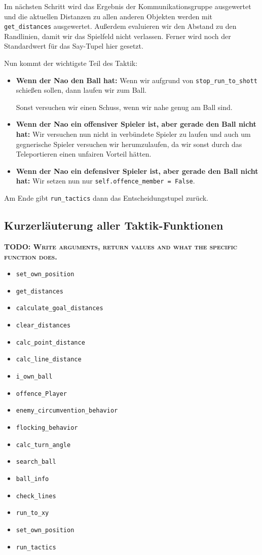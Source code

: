 Im nächsten Schritt wird das Ergebnis der Kommunikationsgruppe ausgewertet und die aktuellen Distanzen zu allen anderen Objekten werden mit \texttt{get\_distances} ausgewertet. Außerdem evaluieren wir den Abstand zu den Randlinien, damit wir das Spielfeld nicht verlassen. Ferner wird noch der Standardwert für das Say-Tupel hier gesetzt. 

Nun kommt der wichtigste Teil des Taktik:

\begin{itemize}
\item \textbf{Wenn der Nao den Ball hat: }
Wenn wir aufgrund von \texttt{stop\_run\_to\_shott} schießen sollen, dann laufen wir zum Ball.

Sonst versuchen wir einen Schuss, wenn wir nahe genug am Ball sind.
\item \textbf{Wenn der Nao ein offensiver Spieler ist, aber gerade den Ball nicht hat: }
Wir versuchen nun nicht in verbündete Spieler zu laufen und auch um gegnerische Spieler versuchen wir herumzulaufen, da wir sonst durch das Teleportieren einen unfairen Vorteil hätten. 
\item \textbf{Wenn der Nao ein defensiver Spieler ist, aber gerade den Ball nicht hat: }
Wir setzen nun nur \texttt{self.offence\_member = False}.
\end{itemize}

Am Ende gibt \texttt{run\_tactics} dann das \glqq Entscheidungstupel \grqq zurück.

\subsection{Kurzerläuterung aller Taktik-Funktionen}
\textbf{\textsc{TODO: Write arguments, return values and what the specific function does.}}
\begin{itemize}
\item \texttt{set\_own\_position}
\item \texttt{get\_distances}
\item \texttt{calculate\_goal\_distances}
\item \texttt{clear\_distances}
\item \texttt{calc\_point\_distance}
\item \texttt{calc\_line\_distance}
\item \texttt{i\_own\_ball}
\item \texttt{offence\_Player}
\item \texttt{enemy\_circumvention\_behavior}
\item \texttt{flocking\_behavior}
\item \texttt{calc\_turn\_angle}
\item \texttt{search\_ball}
\item \texttt{ball\_info}
\item \texttt{check\_lines}
\item \texttt{run\_to\_xy}
\item \texttt{set\_own\_position}
\item \texttt{run\_tactics}
\end{itemize}

